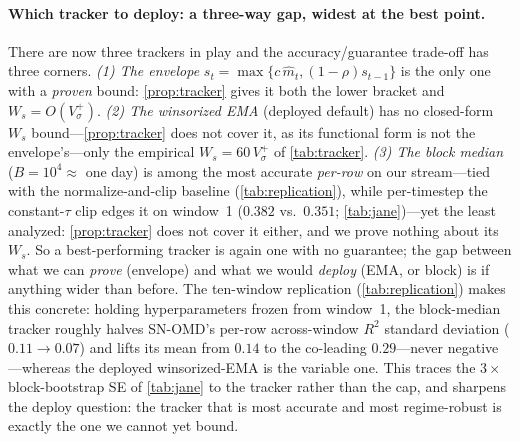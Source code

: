 \documentclass{article}
\begin{document}
\paragraph{Which tracker to deploy: a three-way gap, widest at the best point.} There are
now three trackers in play and the accuracy/guarantee trade-off has three corners.
\emph{(1) The envelope} $s_t=\max\{c\,\hat m_t,(1-\rho)s_{t-1}\}$ is the only one with a
\emph{proven} bound: \cref{prop:tracker} gives it both the lower bracket and
$W_s=O(V_\sigma^+)$. \emph{(2) The winsorized EMA} (deployed default) has no closed-form
$W_s$ bound---\cref{prop:tracker} does not cover it, as its functional form is not the
envelope's---only the empirical $W_s=60\,V_\sigma^+$ of \cref{tab:tracker}. \emph{(3) The
block median} ($B{=}10^4\approx$ one day) is among the most accurate \emph{per-row} on our
stream---tied with the normalize-and-clip baseline (\cref{tab:replication}), while per-timestep
the constant-$\tau$ clip edges it on window~1 ($0.382$ vs.\ $0.351$; \cref{tab:jane})---yet
the least analyzed: \cref{prop:tracker} does not cover it either, and we prove nothing about its
$W_s$. So a best-performing tracker is again one with no guarantee; the gap between what we
can \emph{prove} (envelope) and what we would \emph{deploy} (EMA, or block) is if anything
wider than before. The ten-window replication (\cref{tab:replication}) makes this concrete:
holding hyperparameters frozen from window~1, the block-median tracker roughly halves SN-OMD's
per-row across-window $R^2$ standard deviation ($0.11\!\to\!0.07$) and lifts its mean from
$0.14$ to the co-leading $0.29$---never negative---whereas the deployed
winsorized-EMA is the variable one. This traces the $3\times$ block-bootstrap SE of
\cref{tab:jane} to the tracker rather than the cap, and sharpens the deploy question: the
tracker that is most accurate and most regime-robust is exactly the one we cannot yet bound.
\end{document}
